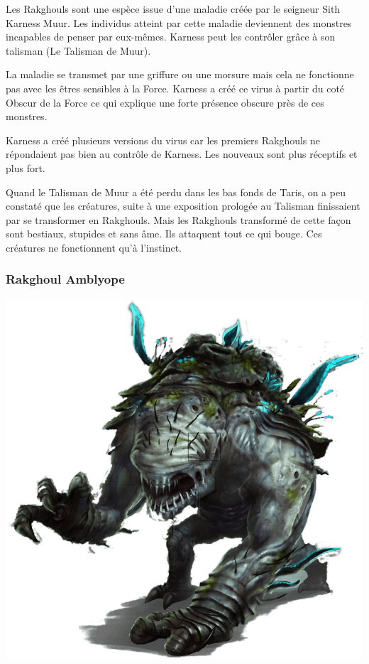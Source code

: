 \newpage
{}
Les Rakghouls sont une espèce issue d’une maladie créée par le seigneur Sith Karness Muur. Les individus atteint par cette maladie deviennent des monstres incapables de penser par eux-mêmes. Karness peut les contrôler grâce à son talisman (Le Talisman de Muur).

La maladie se transmet par une griffure ou une morsure mais cela ne fonctionne pas avec les êtres sensibles à la Force. Karness a créé ce virus à partir du coté Obscur de la Force ce qui explique une forte présence obscure près de ces monstres.

Karness a créé plusieurs versions du virus car les premiers Rakghouls ne répondaient pas bien au contrôle de Karness. Les nouveaux sont plus réceptifs et plus fort.

Quand le Talisman de Muur a été perdu dans les bas fonds de Taris, on a peu constaté que les créatures, suite à une exposition prologée au Talisman finissaient par se transformer en Rakghouls. Mais les Rakghouls transformé de cette façon sont bestiaux, stupides et sans âme. Ils attaquent tout ce qui bouge. Ces créatures ne fonctionnent qu’à l’instinct.

\clearpage
\subsubsection{Rakghoul Amblyope}
\label{sec:rakghoul-amblyope}
\noindent\includegraphics[width=\linewidth]{_img/dos-au-muur/rakghoul-amblyope.png}

